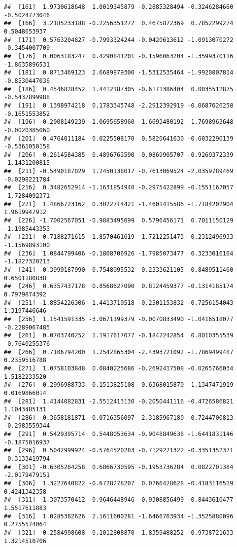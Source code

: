 \documentclass[
  12pt,
]{article}
\begin{document}
\begin{verbatim}
##  [161]  1.9730618648  1.0019345879 -0.2885328494 -0.3246284660 -0.5024773046
##  [166]  3.2185233188 -0.2256351272  0.4675872369  0.7852299274  0.5048653937
##  [171]  0.5763204827 -0.7993324244 -0.0420613612 -1.0913070272 -0.3454007709
##  [176]  0.0063183247  0.4290841201 -0.1596063204 -1.3599370116 -1.8635896531
##  [181]  0.8713469123  2.6689879300 -1.5312535464 -1.9920807814 -0.8530447036
##  [186]  0.4546828452  1.4412187305 -0.6171386404  0.0035512875 -0.5437899988
##  [191]  0.1398974218  0.1783345748 -2.2912392919 -0.0687626258 -0.1651553852
##  [196] -0.2008149239 -1.0695658960 -1.6693480192  1.7698963648 -0.0020385060
##  [201]  0.4764011184 -0.0225508170  0.5820641630 -0.6032290139 -0.5361050158
##  [206]  0.2614584385  0.4896763590 -0.0869905707 -0.9269372339 -1.1431200815
##  [211] -0.5490187029  1.2450138017 -0.7613069524 -2.0359789469 -0.0298221784
##  [216]  0.3482652914 -1.1631854940 -0.2975422899 -0.1551167057 -1.7284092371
##  [221]  1.4866723162  0.3022714421 -1.4601415586 -1.7184202904  1.9619947912
##  [226] -1.7002567051 -0.9883495099  0.5796456171  0.7011150129 -1.1985443353
##  [231] -0.7188271615  1.8570461619  1.7212251473  0.2312496933 -1.1569893100
##  [236]  1.0844799406 -0.1808706926 -1.7985073477  0.3233016164 -1.1827320213
##  [241]  0.3999187990  0.7548095532  0.2333621105  0.8489511460  0.6501180838
##  [246]  0.6357437178  0.8568627090  0.8124459377 -0.1314185174  0.7979874392
##  [251] -1.8854226306  1.4413710518 -0.2501153832 -0.7256154043  1.3197446646
##  [256]  1.1541591335 -3.0671199379 -0.0070833490 -1.0416518077 -0.2289067485
##  [261]  0.0703740252  1.1917617077 -0.1842242854  0.8010355539 -0.7640255376
##  [266]  0.7106794200  1.2542865304 -2.4393721092 -1.7869499487  0.2359516788
##  [271]  1.0758103848  0.0840225686 -0.2692417508 -0.0265766034  1.5182233520
##  [276]  0.2996988733 -0.1513825108 -0.6368015870  1.1347471919  0.0169866014
##  [281]  1.4144082831 -2.5512413130 -0.2050441116 -0.4726586821  1.1043485131
##  [286]  0.3658181871  0.0716356097  2.3185967180 -0.7244700813 -0.2983559344
##  [291]  0.5429395714  0.5448053634 -0.9048849638 -1.6441831146 -0.1875016937
##  [296]  0.5042999924 -0.5764520283 -0.7129271322 -0.3351352371 -0.3133419794
##  [301] -0.6305284258  0.6866730595 -0.1953736284  0.0822701384 -2.0179479151
##  [306]  1.3227640822 -0.6728278207  0.0766428628 -0.4183116519  0.4241342358
##  [311] -1.3073570412  0.9646448946  0.9308856499 -0.8443610477  1.5517611883
##  [316]  1.0285382626  2.1611600281 -1.6466763934 -1.3525880096  0.2755574064
##  [321] -0.2584998608 -0.1012808870 -1.8359488252 -0.9738721633  1.3214510706

\end{verbatim}
\end{document}
